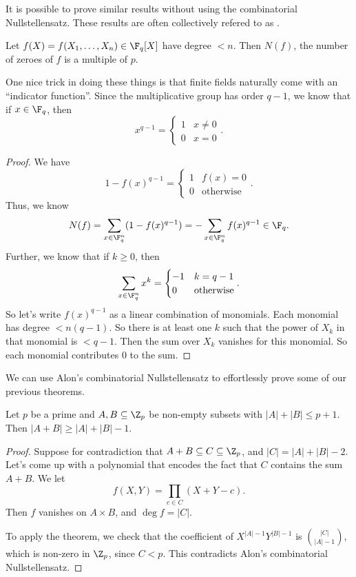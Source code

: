 \documentclass[a4paper]{article}
\begin{document}
It is possible to prove similar results without using the combinatorial Nullstellensatz. These results are often collectively refered to as .
\begin{thm}[Warning]
  Let $f(X) = f(X_1, \ldots, X_n) \in \F_q[X]$ have degree $< n$. Then $N(f)$, the number of zeroes of $f$ is a multiple of $p$.
\end{thm}

One nice trick in doing these things is that finite fields naturally come with an ``indicator function''. Since the multiplicative group has order $q - 1$, we know that if $x \in \F_q$, then
\[
  x^{q - 1} =
  \begin{cases}
    1 & x \not= 0\\
    0 & x = 0
  \end{cases}.
\]
\begin{proof}
  We have
  \[
    1 - f(x)^{q - 1} =
    \begin{cases}
      1 & f(x) = 0\\
      0 & \text{otherwise}
    \end{cases}.
  \]
  Thus, we know
  \[
    N(f) = \sum_{x \in \F_q^n} (1 - f(x)^{q - 1}) = -\sum_{x \in \F_q^n} f(x)^{q - 1} \in \F_q. 
  \]
  Further, we know that if $k \geq 0$, then
  \[
    \sum_{x \in \F_q^n} x^k =
    \begin{cases}
      -1 & k = q - 1\\
      0 & \text{otherwise}
    \end{cases}.
  \]
  So let's write $f(x)^{q - 1}$ as a linear combination of monomials. Each monomial has degree $<n(q - 1)$. So there is at least one $k$ such that the power of $X_k$ in that monomial is $< q - 1$. Then the sum over $X_k$ vanishes for this monomial. So each monomial contributes $0$ to the sum.
\end{proof}

We can use Alon's combinatorial Nullstellensatz to effortlessly prove some of our previous theorems.
\begin{thm}
  Let $p$ be a prime and $A, B \subseteq \Z_p$ be non-empty subsets with $|A| + |B| \leq p + 1$. Then $|A + B| \geq |A| + |B| - 1$.
\end{thm}

\begin{proof}
  Suppose for contradiction that $A + B \subseteq C \subseteq \Z_p$, and $|C| = |A| + |B| - 2$. Let's come up with a polynomial that encodes the fact that $C$ contains the sum $A + B$. We let
  \[
    f(X, Y) = \prod_{c \in C} (X + Y - c).
  \]
  Then $f$ vanishes on $A \times B$, and $\deg f = |C|$.

  To apply the theorem, we check that the coefficient of $X^{|A| - 1} Y^{|B| - 1}$ is $\binom{|C|}{|A| - 1}$, which is non-zero in $\Z_p$, since $C < p$. This contradicts Alon's combinatorial Nullstellensatz.
\end{proof}
\end{document}

